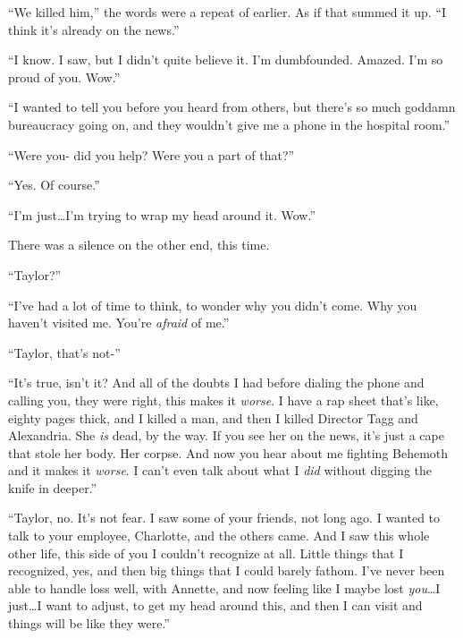 ``We killed him,'' the words were a repeat of earlier.  As if that summed it up.  ``I think it's already on the news.''



``I know.  I saw, but I didn't quite believe it.  I'm dumbfounded.  Amazed.  I'm so proud of you.  Wow.''



``I wanted to tell you before you heard from others, but there's so much goddamn bureaucracy going on, and they wouldn't give me a phone in the hospital room.''



``Were you- did you help?  Were you a part of that?''



``Yes.  Of course.''



``I'm just\ldots I'm trying to wrap my head around it.  Wow.''



There was a silence on the other end, this time.



``Taylor?''



``I've had a lot of time to think, to wonder why you didn't come.  Why you haven't visited me.  You're \emph{afraid} of me.''



``Taylor, that's not-''



``It's true, isn't it?  And all of the doubts I had before dialing the phone and calling you, they were right, this makes it \emph{worse}.  I have a rap sheet that's like, eighty pages thick, and I killed a man, and then I killed Director Tagg and Alexandria.  She \emph{is} dead, by the way.  If you see her on the news, it's just a cape that stole her body.  Her corpse.  And now you hear about me fighting Behemoth and it makes it \emph{worse}.  I can't even talk about what I \emph{did} without digging the knife in deeper.''



``Taylor, no.  It's not fear.  I saw some of your friends, not long ago.  I wanted to talk to your employee, Charlotte, and the others came.  And I saw this whole other life, this side of you I couldn't recognize at all.  Little things that I recognized, yes, and then big things that I could barely fathom.  I've never been able to handle loss well, with Annette, and now feeling like I maybe lost \emph{you}\ldots  I just\ldots I want to adjust, to get my head around this, and then I can visit and things will be like they were.''



